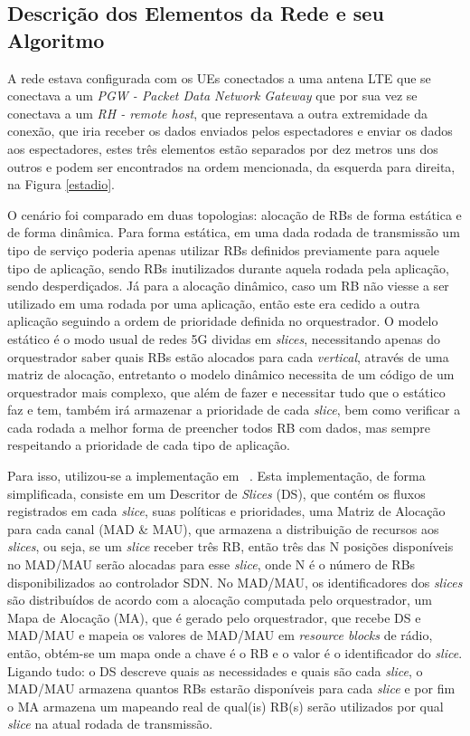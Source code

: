 \documentclass[11pt,twoside]{article}
\begin{document}
\subsection{Descrição dos Elementos da Rede e seu Algoritmo}

	A rede estava configurada com os UEs conectados a uma antena LTE que se conectava a um \textit{PGW - Packet Data Network Gateway} que por sua vez se conectava a um \textit{RH - remote host}, que representava a outra extremidade da conexão, que iria receber os dados enviados pelos espectadores e enviar os dados aos espectadores, estes três elementos estão separados por dez metros uns dos outros e podem ser encontrados na ordem mencionada, da esquerda para direita, na Figura \ref{estadio}.
	
	O cenário foi comparado em duas topologias: alocação de RBs de forma estática e de forma dinâmica. Para forma estática, em uma dada rodada de transmissão um tipo de serviço poderia apenas utilizar RBs definidos previamente para aquele tipo de aplicação, sendo RBs inutilizados durante aquela rodada pela aplicação, sendo desperdiçados. Já para a alocação dinâmico, caso um RB não viesse a ser utilizado em uma rodada por uma aplicação, então este era cedido a outra aplicação seguindo a ordem de prioridade definida no orquestrador. O modelo estático é o modo usual de redes 5G dividas em \textit{slices}, necessitando apenas do orquestrador saber quais RBs estão alocados para cada \textit{vertical}, através de uma matriz de alocação, entretanto o modelo dinâmico necessita de um código de um orquestrador mais complexo, que além de fazer e necessitar tudo que o estático faz e tem, também irá armazenar a prioridade de cada \textit{slice}, bem como verificar a cada rodada a melhor forma de preencher todos RB com dados, mas sempre respeitando a prioridade de cada tipo de aplicação.
	
	Para isso, utilizou-se a implementação em ~\cite{rezende3}. Esta implementação, de forma simplificada, consiste em um Descritor de \textit{Slices} (DS), que contém os fluxos registrados em cada \textit{slice}, suas políticas e prioridades, uma Matriz de Alocação para cada canal (MAD \& MAU), que armazena a distribuição de recursos aos \textit{slices}, ou seja,  se um \textit{slice} receber três RB, então três das N posições disponíveis no MAD/MAU serão alocadas para esse \textit{slice}, onde N é o número de RBs disponibilizados ao controlador SDN. No MAD/MAU, os identificadores dos \textit{slices} são distribuídos de acordo com a alocação computada pelo orquestrador, um Mapa de Alocação (MA), que é gerado pelo orquestrador, que recebe DS e MAD/MAU e mapeia os valores de MAD/MAU em \textit{resource blocks} de rádio, então, obtém-se um mapa onde a chave é o RB e o valor é o identificador do \textit{slice}. Ligando tudo: o DS descreve quais as necessidades e quais são cada \textit{slice}, o MAD/MAU armazena quantos RBs estarão disponíveis para cada \textit{slice} e por fim o MA armazena um mapeando real de qual(is) RB(s) serão utilizados por qual \textit{slice} na atual rodada de transmissão.
\end{document}
